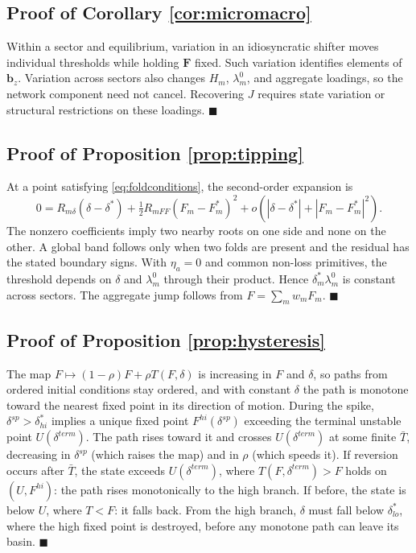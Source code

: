 \documentclass[11pt]{article}
\theoremstyle{definition}
\begin{document}
\subsection{Proof of Corollary \ref{cor:micromacro}}
Within a sector and equilibrium, variation in an idiosyncratic shifter moves individual thresholds while holding $\mathbf F$ fixed. Such variation identifies elements of $\mathbf b_z$. Variation across sectors also changes $H_m$, $\lambda_m^0$, and aggregate loadings, so the network component need not cancel. Recovering $J$ requires state variation or structural restrictions on these loadings. $\blacksquare$

\subsection{Proof of Proposition \ref{prop:tipping}}
At a point satisfying \eqref{eq:foldconditions}, the second-order expansion is
\[
0=R_{m\delta}(\delta-\delta^*)+\tfrac12R_{mFF}(F_m-F_m^*)^2+o(|\delta-\delta^*|+|F_m-F_m^*|^2).
\]
The nonzero coefficients imply two nearby roots on one side and none on the other. A global band follows only when two folds are present and the residual has the stated boundary signs. With $\eta_a=0$ and common non-loss primitives, the threshold depends on $\delta$ and $\lambda_m^0$ through their product. Hence $\delta_m^*\lambda_m^0$ is constant across sectors. The aggregate jump follows from $F=\sum_mw_mF_m$. $\blacksquare$

\subsection{Proof of Proposition \ref{prop:hysteresis}}
The map $F \mapsto (1-\rho)F + \rho T(F,\delta)$ is increasing in $F$ and $\delta$, so paths from ordered initial conditions stay ordered, and with constant $\delta$ the path is monotone toward the nearest fixed point in its direction of motion. During the spike, $\delta^{sp} > \delta^*_{hi}$ implies a unique fixed point $F^{hi}(\delta^{sp})$ exceeding the terminal unstable point $U(\delta^{term})$. The path rises toward it and crosses $U(\delta^{term})$ at some finite $\bar T$, decreasing in $\delta^{sp}$ (which raises the map) and in $\rho$ (which speeds it). If reversion occurs after $\bar T$, the state exceeds $U(\delta^{term})$, where $T(F,\delta^{term}) > F$ holds on $(U, F^{hi})$: the path rises monotonically to the high branch. If before, the state is below $U$, where $T < F$: it falls back. From the high branch, $\delta$ must fall below $\delta^*_{lo}$, where the high fixed point is destroyed, before any monotone path can leave its basin. $\blacksquare$
\end{document}
